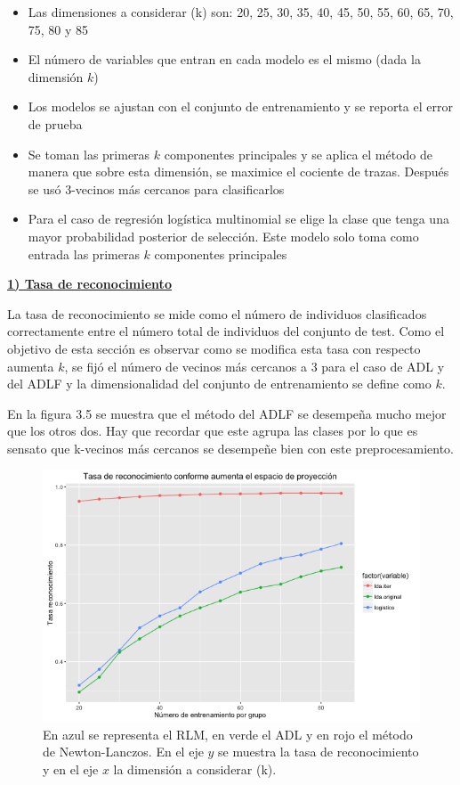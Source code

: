 \begin{itemize}
\item Las dimensiones a considerar (k) son: 20, 25, 30, 35, 40, 45, 50, 55, 60, 65, 70, 75, 80 y 85
\item El número de variables que entran en cada modelo es el mismo (dada la dimensión $k$)
\item Los modelos se ajustan con el conjunto de entrenamiento y se reporta el error de prueba
\item Se toman las primeras $k$ componentes principales y se aplica el método de manera que sobre esta dimensión, se maximice el cociente de trazas. Después se usó 3-vecinos más cercanos para clasificarlos
\item Para el caso de regresión logística multinomial se elige la clase que tenga una mayor probabilidad posterior de selección. Este modelo solo toma como entrada las primeras $k$ componentes principales
\end{itemize}

\underline{\textbf{1) Tasa de reconocimiento}}

La tasa de reconocimiento se mide como el número de individuos clasificados correctamente entre el número total de individuos del conjunto de test. Como el objetivo de esta sección es observar como se modifica esta tasa con respecto aumenta $k$, se fijó el número de vecinos más cercanos a 3 para el caso de ADL y del ADLF y la dimensionalidad del conjunto de entrenamiento se define como $k$. 

En la figura 3.5 se muestra que el método del ADLF se desempeña mucho mejor que los otros dos. Hay que recordar que este agrupa las clases por lo que es sensato que k-vecinos más cercanos se desempeñe bien con este preprocesamiento. 

\begin{figure}[!ht]
  \centering
	\includegraphics[width=1\textwidth]{Figures/Chapter4_comp_StateFarm.png}	
  \caption[Tasa de reconocimiento de los 3 métodos (State Farm)]
  {En azul se representa el RLM, en verde el ADL y en rojo el método de Newton-Lanczos. En el eje $y$ se muestra la tasa de reconocimiento y en el eje $x$ la dimensión a considerar (k).}
\end{figure}

